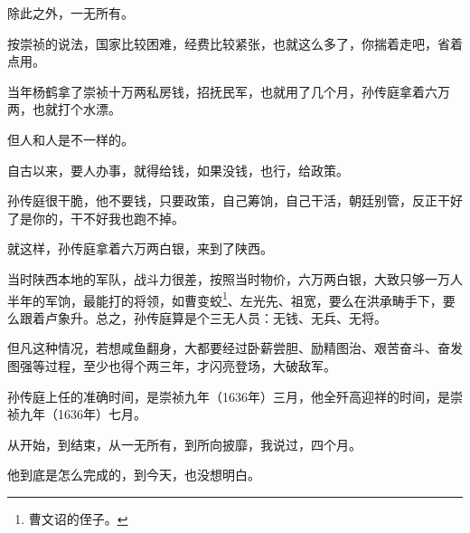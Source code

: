 \begin{multicols}{\theparacolNo}
除此之外，一无所有。

按崇祯的说法，国家比较困难，经费比较紧张，也就这么多了，你揣着走吧，省着点用。

当年杨鹤拿了崇祯十万两私房钱，招抚民军，也就用了几个月，孙传庭拿着六万两，也就打个水漂。

但人和人是不一样的。

自古以来，要人办事，就得给钱，如果没钱，也行，给政策。

孙传庭很干脆，他不要钱，只要政策，自己筹饷，自己干活，朝廷别管，反正干好了是你的，干不好我也跑不掉。

就这样，孙传庭拿着六万两白银，来到了陕西。

当时陕西本地的军队，战斗力很差，按照当时物价，六万两白银，大致只够一万人半年的军饷，最能打的将领，如曹变蛟\footnote{曹文诏的侄子。}、左光先、祖宽，要么在洪承畴手下，要么跟着卢象升。总之，孙传庭算是个三无人员：无钱、无兵、无将。

但凡这种情况，若想咸鱼翻身，大都要经过卧薪尝胆、励精图治、艰苦奋斗、奋发图强等过程，至少也得个两三年，才闪亮登场，大破敌军。

孙传庭上任的准确时间，是崇祯九年（1636年）三月，他全歼高迎祥的时间，是崇祯九年（1636年）七月。

从开始，到结束，从一无所有，到所向披靡，我说过，四个月。

他到底是怎么完成的，到今天，也没想明白。
\ifnum{}
	\end{multicols}
\fi
\newpage
